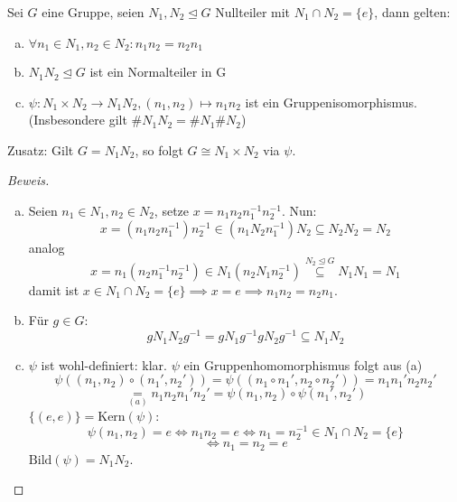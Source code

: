 \documentclass[a4paper]{report}
\begin{document}
\begin{prop}
  Sei $G$ eine Gruppe, seien $N_{1}, N_{2} \trianglelefteq G$ Nullteiler mit $N_{1} \cap N_{2} = \{e\}$, dann gelten:
  \begin{enumerate}[(a)]
    \item $\forall n_{1} \in N_{1}, n_{2} \in N_{2}: n_{1}n_{2} = n_{2}n_{1}$
    \item $N_{1}N_{2} \trianglelefteq G$ ist ein Normalteiler in G
    \item $\psi : N_{1} \times N_{2} \to N_{1}N_{2}, (n_{1},n_{2}) \mapsto n_{1}n_{2}$ ist ein Gruppenisomorphismus. (Insbesondere gilt $\#N_{1}N_{2} = \#N_{1} \#N_{2}$)
  \end{enumerate}
  Zusatz: Gilt $G = N_{1}N_{2}$, so folgt $G \cong N_{1} \times N_{2}$ via $\psi$.
  \begin{proof}[Beweis]
\begin{enumerate}[(a)]
  \item  Seien $n_{1} \in N_{1}, n_{2} \in N_{2}$, setze $x = n_{1}n_{2}n_{1}^{-1}n_{2}^{-1}$.
        Nun: $$x = (n_{1}n_{2}n_{1}^{-1})n_{2}^{-1} \in (n_{1}N_{2}n_{1}^{-1})N_{2} \subseteq N_{2}N_{2} = N_{2}$$
        analog $$x = n_{1}(n_{2}n_{1}^{-1}n_{2}^{-1}) \in N_{1}(n_{2}N_{1}n_{2}^{-1}) \overset{N_{2} \trianglelefteq G}\subseteq N_{1}N_{1} = N_{1}$$
        damit ist $x \in N_{1} \cap N_{2} = \{e\} \implies x = e \implies n_{1}n_{2} = n_{2}n_{1}$.

  \item Für $g \in G$:
        $$gN_{1}N_{2}g^{-1}= gN_{1}g^{-1}gN_{2}g^{-1} \subseteq  N_{1}N_{2}$$

  \item $\psi$ ist wohl-definiert: klar. $\psi$ ein Gruppenhomomorphismus folgt aus (a)
        $$\psi((n_{1}, n_{2}) \circ (n_{1}', n_{2}')) = \psi((n_{1} \circ n_{1}', n_{2} \circ n_{2}')) = n_{1}n_{1}' n_{2}n_{2}'$$
        $$\underset{(a)}= n_{1}n_{2}n_{1}'n_{2}' = \psi(n_{1}, n_{2}) \circ \psi(n_{1}', n_{2}')$$
        $\{(e, e)\} = \mathrm{Kern}(\psi)$:
        $$\psi(n_{1}, n_{2}) = e \iff n_{1}n_{2} = e \iff n_{1} = n_{2}^{-1} \in N_{1}\cap N_{2} = \{e\}$$
        $$\iff n_{1} = n_{2} = e$$
$\mathrm{Bild}(\psi) = N_{1}N_{2}$.
\end{enumerate}
  \end{proof}
\end{prop}
\end{document}
